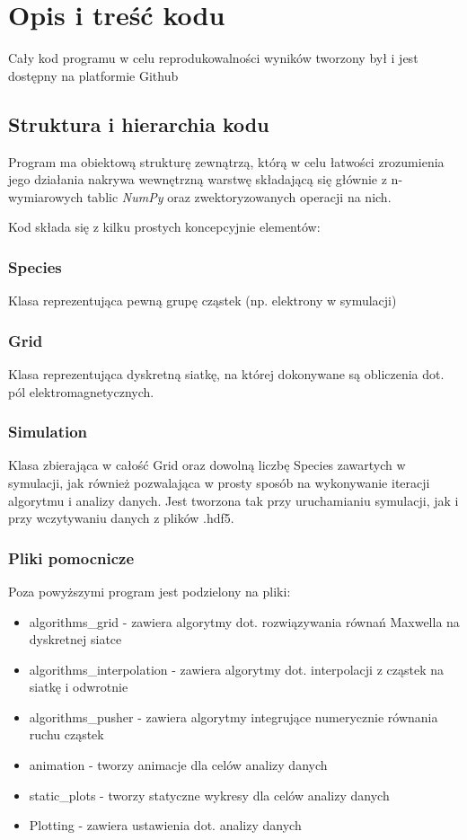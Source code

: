 \section{Opis i treść kodu} %
Cały kod programu w celu reprodukowalności wyników tworzony był i jest dostępny na platformie Github %

\subsection{Struktura i hierarchia kodu}

Program ma obiektową strukturę zewnątrzą, którą w celu łatwości zrozumienia jego działania nakrywa wewnętrzną warstwę
składającą się głównie z n-wymiarowych tablic \emph{NumPy} oraz zwektoryzowanych operacji na nich.

Kod składa się z kilku prostych koncepcyjnie elementów:

\subsubsection{Species}
Klasa reprezentująca pewną grupę cząstek (np. elektrony w symulacji)

\subsubsection{Grid}
Klasa reprezentująca dyskretną siatkę, na której dokonywane są obliczenia dot. pól elektromagnetycznych.

\subsubsection{Simulation}
Klasa zbierająca w całość Grid oraz dowolną liczbę Species zawartych w symulacji, jak również
pozwalająca w prosty sposób na wykonywanie iteracji algorytmu i analizy danych. Jest tworzona tak przy
uruchamianiu symulacji, jak i przy wczytywaniu danych z plików .hdf5.

\subsubsection{Pliki pomocnicze}
Poza powyższymi program jest podzielony na pliki:
\begin{itemize}
\item algorithms\_grid - zawiera algorytmy dot. rozwiązywania równań Maxwella na dyskretnej siatce
\item algorithms\_interpolation - zawiera algorytmy dot. interpolacji z cząstek na siatkę i odwrotnie
\item algorithms\_pusher - zawiera algorytmy integrujące numerycznie równania ruchu cząstek
\item animation - tworzy animacje dla celów analizy danych
\item static\_plots - tworzy statyczne wykresy dla celów analizy danych
\item Plotting - zawiera ustawienia dot. analizy danych %
\end{itemize}

